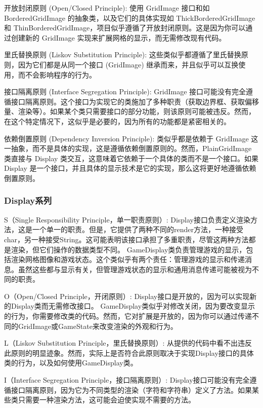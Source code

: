 开放封闭原则 (Open/Closed Principle):
使用 GridImage 接口和如 BorderedGridImage 的抽象类，以及它们的具体实现如 ThickBorderedGridImage 和 ThinBorderedGridImage，项目似乎遵循了开放封闭原则。这是因为你可以通过创建新的 GridImage 实现来扩展网格的显示，而无需修改现有代码。

里氏替换原则 (Liskov Substitution Principle):
这些类似乎都遵循了里氏替换原则，因为它们都是从同一个接口 (GridImage) 继承而来，并且似乎可以互换使用，而不会影响程序的行为。

接口隔离原则 (Interface Segregation Principle):
GridImage 接口可能没有完全遵循接口隔离原则。这个接口为实现它的类施加了多种职责（获取边界框、获取偏移量、渲染等）。如果某个类只需要接口的部分功能，则该原则可能被违反。然而，在这个特定情况下，这似乎是必要的，因为所有的功能都是紧密相关的。

依赖倒置原则 (Dependency Inversion Principle):
类似乎都是依赖于 GridImage 这一抽象，而不是具体的实现，这是遵循依赖倒置原则的。然而，PlainGridImage 类直接与 Display 类交互，这意味着它依赖于一个具体的类而不是一个接口。如果 Display 是一个接口，并且具体的显示技术是它的实现，那么这将更好地遵循依赖倒置原则。

\subsubsection{Display系列}

S（Single Responsibility Principle，单一职责原则）:
Display接口负责定义渲染方法，这是一个单一的职责。但是，它提供了两种不同的render方法，一种接受char，另一种接受String。这可能表明该接口承担了多重职责，尽管这两种方法都是渲染，但它们操作的数据类型不同。
GameDisplay类负责管理游戏的显示，包括渲染网格图像和游戏状态。这个类似乎有两个责任：管理游戏的显示和传递消息。虽然这些都与显示有关，但管理游戏状态的显示和通用消息传递可能被视为不同的职责。

O（Open/Closed Principle，开闭原则）:
Display接口是开放的，因为可以实现新的Display类而无需修改接口。
GameDisplay类似乎对修改关闭，因为要改变显示的行为，你需要修改类的代码。然而，它对扩展是开放的，因为你可以通过传递不同的GridImage或GameState来改变渲染的外观和行为。

L（Liskov Substitution Principle，里氏替换原则）:
从提供的代码中看不出违反此原则的明显迹象。然而，实际上是否符合此原则取决于实现Display接口的具体类的行为，以及如何使用GameDisplay类。

I（Interface Segregation Principle，接口隔离原则）:
Display接口可能没有完全遵循接口隔离原则，因为它为不同类型的渲染（字符和字符串）定义了方法。如果某些类只需要一种渲染方法，这可能会迫使实现不需要的方法。

